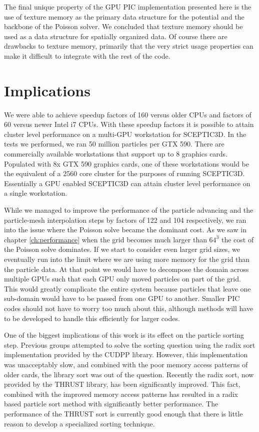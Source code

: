 The final unique property of the GPU PIC implementation presented here is the use of texture memory as the primary data structure for the potential and the backbone of the Poisson solver. We concluded that texture memory should be used as a data structure for spatially organized data. Of course there are drawbacks to texture memory, primarily that the very strict usage properties can make it difficult to integrate with the rest of the code. 



\section{Implications}
We were able to achieve speedup factors of 160 versus older CPUs and factors of 60 versus newer Intel i7 CPUs. With these speedup factors it is possible to attain cluster level performance on a multi-GPU workstation for SCEPTIC3D. In the tests we performed, we ran 50 million particles per GTX 590. There are commercially available workstations that support up to 8 graphics cards. Populated with 8x GTX 590 graphics cards, one of these workstations would be the equivalent of a 2560 core cluster for the purposes of running SCEPTIC3D. Essentially a GPU enabled SCEPTIC3D can attain cluster level performance on a single workstation. 

While we managed to improve the performance of the particle advancing and the particle-mesh interpolation steps by factors of 122 and 104 respectively, we ran into the issue where the Poisson solve became the dominant cost. As we saw in chapter \ref{ch:performance} when the grid becomes much larger than $64^3$ the cost of the Poisson solve dominates. If we start to consider even larger grid sizes, we eventually run into the limit where we are using more memory for the grid than the particle data. At that point we would have to decompose the domain across multiple GPUs such that each GPU only moved particles on part of the grid. This would greatly complicate the entire system because particles that leave one sub-domain would have to be passed from one GPU to another. Smaller PIC codes should not have to worry too much about this, although methods will have to be developed to handle this efficiently for larger codes.

One of the biggest implications of this work is its effect on the particle sorting step. Previous groups attempted to solve the sorting question using the radix sort implementation provided by the CUDPP library. However, this implementation was unacceptably slow, and combined with the poor memory access patterns of older cards, the library sort was out of the question. Recently the radix sort, now provided by the THRUST library, has been significantly improved. This fact, combined with the improved memory access patterns has resulted in a radix based particle sort method with significantly better performance. The performance of the THRUST sort is currently good enough that there is little reason to develop a specialized sorting technique. 

